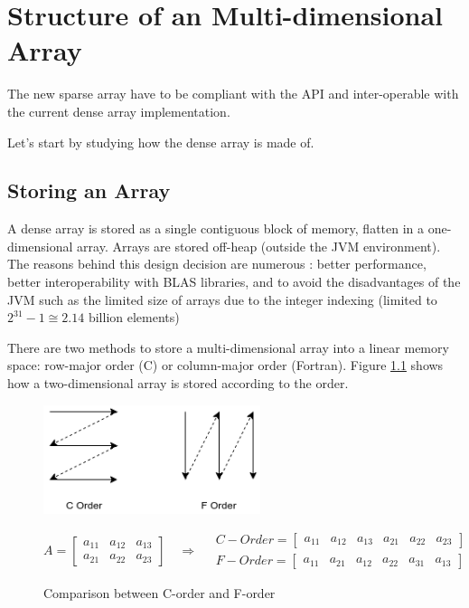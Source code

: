 \chapter{Structure of an Multi-dimensional Array}
The new sparse array have to be compliant with the API and inter-operable with the current dense array implementation.

Let's start by studying how the dense array is made of.
\section{Storing an Array}

A dense array is stored as a single contiguous block of memory, flatten in a one-dimensional array. Arrays are stored off-heap (outside the JVM environment). The reasons behind this design decision are numerous : better performance, better interoperability with BLAS libraries, and to avoid the disadvantages of the {JVM} such as the limited size of arrays due to the integer indexing (limited to $2^{31}-1 \cong 2.14 \text{ billion}$ elements)

There are two methods to store a multi-dimensional array into a linear memory space: row-major order (C) or column-major order (Fortran). Figure \ref{fig:orders} shows how a two-dimensional array is stored according to the order.

\begin{figure}[h]
	\begin{center}
		\includegraphics[width=2.5in]{images/c_f_OrdersLabelled.png} 
		\label{fig:cOrders}
	\end{center}
	\[
	A = 
	\begin{bmatrix}
	a_{11} &  a_{12} & a_{13} \\
	a_{21} &  a_{22} & a_{23}
	\end{bmatrix}
	\quad\Rightarrow\quad
	\begin{aligned}
	C-Order = 
	\begin{bmatrix}
	a_{11} &  a_{12} & a_{13} & a_{21} &  a_{22} & a_{23}
	\end{bmatrix}
	\\
	F-Order = 
	\begin{bmatrix}
	a_{11} &  a_{21} & a_{12} & a_{22} &  a_{31} & a_{13}
	\end{bmatrix}
	\end{aligned}
	\]
\caption{Comparison between C-order and F-order}
\label{fig:orders}

\end{figure}

